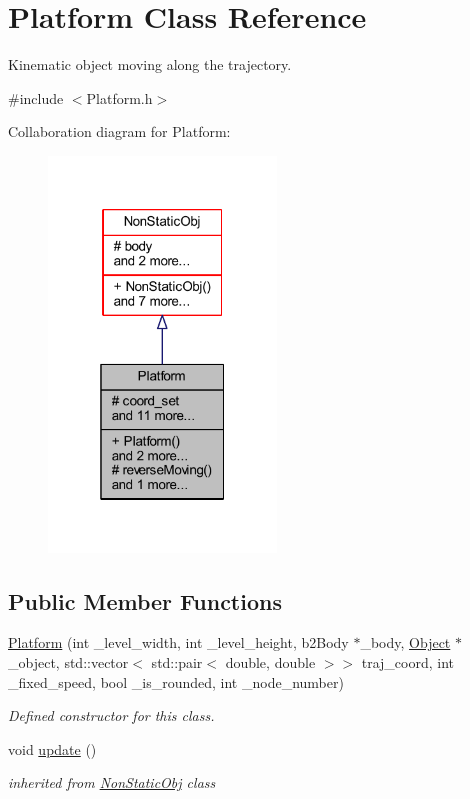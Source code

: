 \hypertarget{class_platform}{}\section{Platform Class Reference}
\label{class_platform}


Kinematic object moving along the trajectory.  




{\ttfamily \#include $<$Platform.\+h$>$}



Collaboration diagram for Platform\+:\nopagebreak
\begin{figure}[H]
\begin{center}
\leavevmode
\includegraphics[width=172pt]{class_platform__coll__graph}
\end{center}
\end{figure}
\subsection*{Public Member Functions}
\begin{DoxyCompactItemize}
\item 
\hyperlink{class_platform_a39509ca7de720cf50d0b0ea71e29bfaf}{Platform} (int \+\_\+level\+\_\+width, int \+\_\+level\+\_\+height, b2\+Body $\ast$\+\_\+body, \hyperlink{class_object}{Object} $\ast$\+\_\+object, std\+::vector$<$ std\+::pair$<$ double, double $>$$>$ traj\+\_\+coord, int \+\_\+fixed\+\_\+speed, bool \+\_\+is\+\_\+rounded, int \+\_\+node\+\_\+number)
\begin{DoxyCompactList}\small\item\em Defined constructor for this class. \end{DoxyCompactList}\item 
\mbox{\label{class_platform_aa601f00a3625669bb39252cfc932efa0}} 
void \hyperlink{class_platform_aa601f00a3625669bb39252cfc932efa0}{update} ()
\begin{DoxyCompactList}\small\item\em inherited from \hyperlink{class_non_static_obj}{Non\+Static\+Obj} class \end{DoxyCompactList}\end{DoxyCompactItemize}
